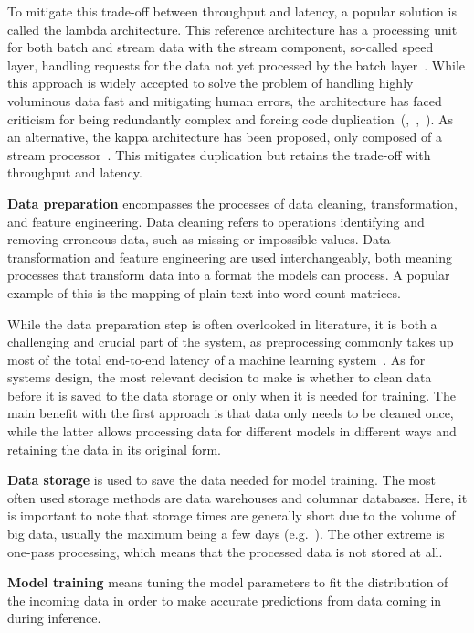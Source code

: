 To mitigate this trade-off between throughput and latency, a popular solution is called the lambda architecture. This reference architecture has a processing unit for both batch and stream data with the stream component, so-called speed layer, handling requests for the data not yet processed by the batch layer~\cite{beatingcap}. While this approach is widely accepted to solve the problem of handling highly voluminous data fast and mitigating human errors, the architecture has faced criticism for being redundantly complex and forcing code duplication~(\cite{questioninglambda},~\cite{uber},~\cite{facebook}). As an alternative, the kappa architecture has been proposed, only composed of a stream processor~\cite{questioninglambda}. This mitigates duplication but retains the trade-off with throughput and latency.

\textbf{Data preparation} encompasses the processes of data cleaning, transformation, and feature engineering. Data cleaning refers to operations identifying and removing erroneous data, such as missing or impossible values. Data transformation and feature engineering are used interchangeably, both meaning processes that transform data into a format the models can process. A popular example of this is the mapping of plain text into word count matrices.

While the data preparation step is often overlooked in literature,
it is both a challenging and crucial part of the system, as preprocessing commonly takes up most of the total end-to-end latency of a machine learning system~\cite{adaptivelearningsystems}. As for systems design, the most relevant decision to make is whether to clean data before it is saved to the data storage or only when it is  needed for training. The main benefit with the first approach is that data only needs to be cleaned once, while the latter allows processing data for different models in different ways and retaining the data in its original form.

\textbf{Data storage} is used to save the data needed for model training. The most often used storage methods are data warehouses and columnar databases. Here, it is important to note that storage times are generally short due to the volume of big data, usually the maximum being a few days (e.g.~\cite{uber}). The other extreme is one-pass processing, which means that the processed data is not stored at all.

\textbf{Model training} means tuning the model parameters to fit the distribution of the incoming data in order to make accurate predictions from data coming in during inference.

